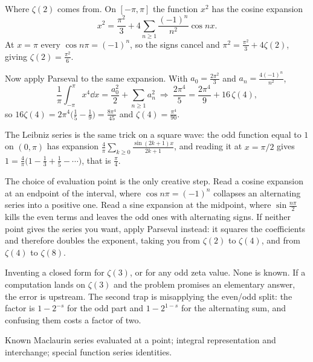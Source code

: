 \begin{worked}
Where $\zeta(2)$ comes from. On $[-\pi,\pi]$ the function $x^{2}$ has the cosine expansion
\[x^{2}=\frac{\pi^{2}}{3}+4\sum_{n\geq1}\frac{(-1)^{n}}{n^{2}}\cos nx.\]
At $x=\pi$ every $\cos n\pi=(-1)^{n}$, so the signs cancel and $\pi^{2}=\tfrac{\pi^{2}}{3}+4\zeta(2)$, giving $\zeta(2)=\tfrac{\pi^{2}}{6}$.

Now apply Parseval to the same expansion. With $a_0=\tfrac{2\pi^{2}}{3}$ and $a_n=\tfrac{4(-1)^{n}}{n^{2}}$,
\[\frac{1}{\pi}\int_{-\pi}^{\pi}x^{4}\dd x=\frac{a_0^{2}}{2}+\sum_{n\geq1}a_n^{2}\ \Longrightarrow\ \frac{2\pi^{4}}{5}=\frac{2\pi^{4}}{9}+16\,\zeta(4),\]
so $16\zeta(4)=2\pi^{4}\bigl(\tfrac15-\tfrac19\bigr)=\tfrac{8\pi^{4}}{45}$ and $\zeta(4)=\tfrac{\pi^{4}}{90}$.

The Leibniz series is the same trick on a square wave: the odd function equal to $1$ on $(0,\pi)$ has expansion $\tfrac{4}{\pi}\sum_{k\geq0}\tfrac{\sin(2k+1)x}{2k+1}$, and reading it at $x=\pi/2$ gives $1=\tfrac{4}{\pi}\bigl(1-\tfrac13+\tfrac15-\cdots\bigr)$, that is $\tfrac{\pi}{4}$.
\end{worked}

\begin{keynote}
The choice of evaluation point is the only creative step. Read a cosine expansion at an endpoint of the interval, where $\cos n\pi=(-1)^{n}$ collapses an alternating series into a positive one. Read a sine expansion at the midpoint, where $\sin\tfrac{n\pi}{2}$ kills the even terms and leaves the odd ones with alternating signs. If neither point gives the series you want, apply Parseval instead: it squares the coefficients and therefore doubles the exponent, taking you from $\zeta(2)$ to $\zeta(4)$, and from $\zeta(4)$ to $\zeta(8)$.
\end{keynote}

\begin{trap}
Inventing a closed form for $\zeta(3)$, or for any odd zeta value. None is known. If a computation lands on $\zeta(3)$ and the problem promises an elementary answer, the error is upstream. The second trap is misapplying the even/odd split: the factor is $1-2^{-s}$ for the odd part and $1-2^{1-s}$ for the alternating sum, and confusing them costs a factor of two.
\end{trap}

\begin{seealsob}Known Maclaurin series evaluated at a point; integral representation and interchange; special function series identities.\end{seealsob}

